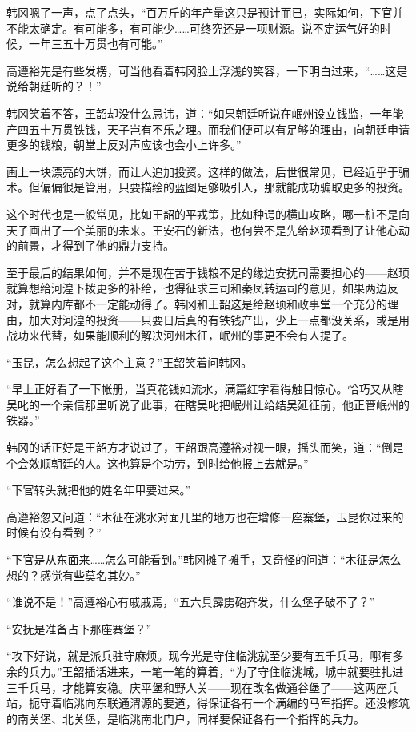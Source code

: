 韩冈嗯了一声，点了点头，“百万斤的年产量这只是预计而已，实际如何，下官并不能太确定。有可能多，有可能少……可终究还是一项财源。说不定运气好的时候，一年三五十万贯也有可能。”

高遵裕先是有些发楞，可当他看着韩冈脸上浮浅的笑容，一下明白过来，“……这是说给朝廷听的？！”

韩冈笑着不答，王韶却没什么忌讳，道：“如果朝廷听说在岷州设立钱监，一年能产四五十万贯铁钱，天子岂有不乐之理。而我们便可以有足够的理由，向朝廷申请更多的钱粮，朝堂上反对声应该也会小上许多。”

画上一块漂亮的大饼，而让人追加投资。这样的做法，后世很常见，已经近乎于骗术。但偏偏很是管用，只要描绘的蓝图足够吸引人，那就能成功骗取更多的投资。

这个时代也是一般常见，比如王韶的平戎策，比如种谔的横山攻略，哪一桩不是向天子画出了一个美丽的未来。王安石的新法，也何尝不是先给赵顼看到了让他心动的前景，才得到了他的鼎力支持。

至于最后的结果如何，并不是现在苦于钱粮不足的缘边安抚司需要担心的——赵顼就算想给河湟下拨更多的补给，也得征求三司和秦凤转运司的意见，如果两边反对，就算内库都不一定能动得了。韩冈和王韶这是给赵顼和政事堂一个充分的理由，加大对河湟的投资——只要日后真的有铁钱产出，少上一点都没关系，或是用战功来代替，如果能顺利的解决河州木征，岷州的事更不会有人提了。

“玉昆，怎么想起了这个主意？”王韶笑着问韩冈。

“早上正好看了一下帐册，当真花钱如流水，满篇红字看得触目惊心。恰巧又从瞎吴叱的一个亲信那里听说了此事，在瞎吴叱把岷州让给结吴延征前，他正管岷州的铁器。”

韩冈的话正好是王韶方才说过了，王韶跟高遵裕对视一眼，摇头而笑，道：“倒是个会效顺朝廷的人。这也算是个功劳，到时给他报上去就是。”

“下官转头就把他的姓名年甲要过来。”

高遵裕忽又问道：“木征在洮水对面几里的地方也在增修一座寨堡，玉昆你过来的时候有没有看到？”

“下官是从东面来……怎么可能看到。”韩冈摊了摊手，又奇怪的问道：“木征是怎么想的？感觉有些莫名其妙。”

“谁说不是！”高遵裕心有戚戚焉，“五六具霹雳砲齐发，什么堡子破不了？”

“安抚是准备占下那座寨堡？”

“攻下好说，就是派兵驻守麻烦。现今光是守住临洮就至少要有五千兵马，哪有多余的兵力。”王韶插话进来，一笔一笔的算着，“为了守住临洮城，城中就要驻扎进三千兵马，才能算安稳。庆平堡和野人关——现在改名做通谷堡了——这两座兵站，扼守着临洮向东联通渭源的要道，得保证各有一个满编的马军指挥。还没修筑的南关堡、北关堡，是临洮南北门户，同样要保证各有一个指挥的兵力。

